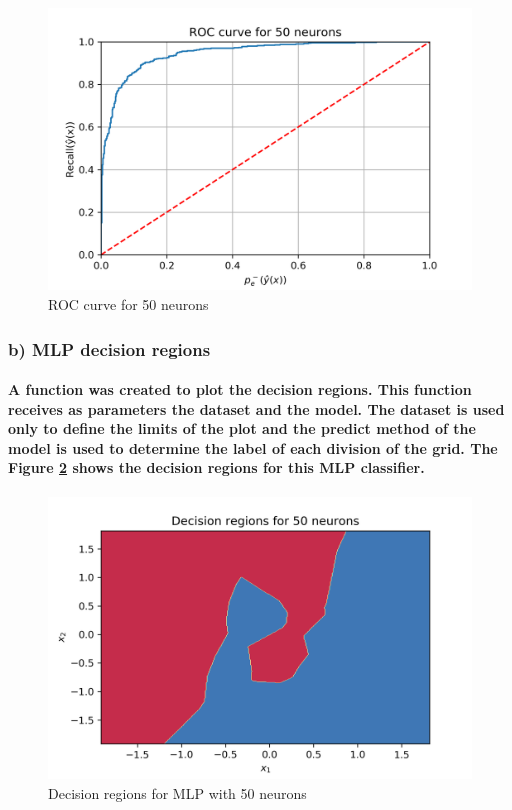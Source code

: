 \documentclass[a4paper]{article}    %
\begin{document}
\begin{figure}[H]
    \centering
    \includegraphics[width=12cm]{ROC_curve}
    \caption{ROC curve for 50 neurons}
    \label{fig:mlp-roc_curve}
\end{figure}

\subsubsection{b) MLP decision regions}

\paragraph{A function was created to plot the decision regions. This function receives as parameters the dataset and the model. The dataset is used only to define the limits of the plot and the predict method of the model is used to determine the label of each division of the grid. The Figure \ref{fig:mlp-decision_regions} shows the decision regions for this MLP classifier.}

\begin{figure}[H]
    \centering
    \includegraphics[width=12cm]{mlp_decision_region}
    \caption{Decision regions for MLP with 50 neurons}
    \label{fig:mlp-decision_regions}
\end{figure}
\end{document}
